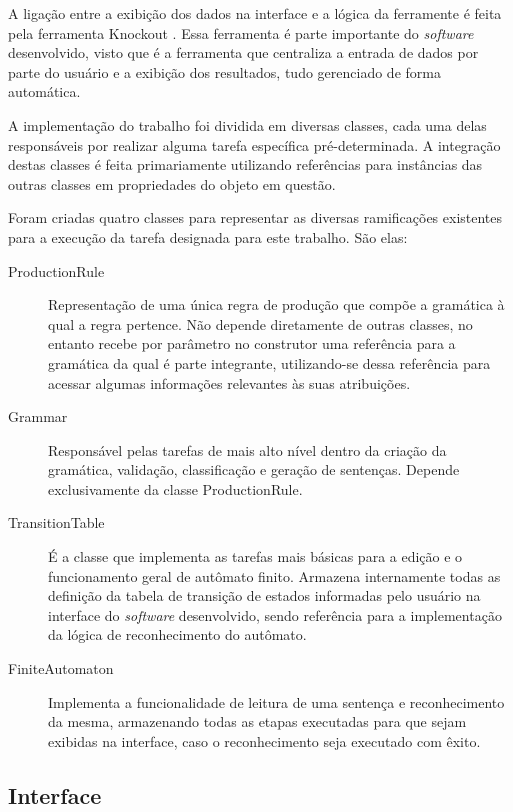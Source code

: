 \documentclass[12pt]{article}
\begin{document}
A ligação entre a exibição dos dados na interface e a lógica da ferramente é feita pela ferramenta Knockout
\cite{knockout}. Essa ferramenta é parte importante do \textit{software} desenvolvido, visto que é a ferramenta que
centraliza a entrada de dados por parte do usuário e a exibição dos resultados, tudo gerenciado de forma automática.

A implementação do trabalho foi dividida em diversas classes, cada uma delas responsáveis por realizar alguma tarefa
específica pré-determinada. A integração destas classes é feita primariamente utilizando referências para instâncias
das outras classes em propriedades do objeto em questão.

Foram criadas quatro classes para representar as diversas ramificações existentes para a execução da tarefa designada
para este trabalho. São elas:

\begin{description}
  \item[ProductionRule]
  Representação de uma única regra de produção que compõe a gramática à qual a regra pertence. Não depende diretamente
  de outras classes, no entanto recebe por parâmetro no construtor uma referência para a gramática da qual é parte
  integrante, utilizando-se dessa referência para acessar algumas informações relevantes às suas atribuições.

  \item[Grammar]
  Responsável pelas tarefas de mais alto nível dentro da criação da gramática, validação, classificação e geração de
  sentenças. Depende exclusivamente da classe ProductionRule.

  \item[TransitionTable]
  É a classe que implementa as tarefas mais básicas para a edição e o funcionamento geral de autômato finito. Armazena
  internamente todas as definição da tabela de transição de estados informadas pelo usuário na interface do
  \textit{software} desenvolvido, sendo referência para a implementação da lógica de reconhecimento do autômato.

  \item[FiniteAutomaton]
  Implementa a funcionalidade de leitura de uma sentença e reconhecimento da mesma, armazenando todas as etapas executadas
  para que sejam exibidas na interface, caso o reconhecimento seja executado com êxito.
\end{description}

\subsection{Interface}
\end{document}
